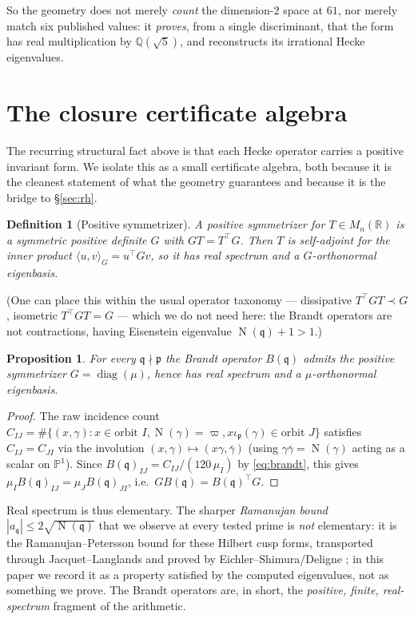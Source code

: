 \documentclass[11pt,a4paper]{article}
\newtheorem{proposition}[theorem]{Proposition}
\newtheorem{definition}[theorem]{Definition}
\newcommand{\Q}{\mathbb{Q}}
\newcommand{\R}{\mathbb{R}}
\newcommand{\PP}{\mathbb{P}}
\newcommand{\fp}{\mathfrak{p}}
\newcommand{\fq}{\mathfrak{q}}
\newcommand{\Brandt}{B}
\DeclareMathOperator{\Nm}{N}
\begin{document}
So the geometry does not merely \emph{count} the dimension-$2$ space at
$61$, nor merely match six published values: it \emph{proves}, from a
single discriminant, that the form has real multiplication by
$\Q(\sqrt5)$, and reconstructs its irrational Hecke eigenvalues.

\section{The closure certificate algebra}\label{sec:cert}

The recurring structural fact above is that each Hecke operator carries
a positive invariant form. We isolate this as a small certificate
algebra, both because it is the cleanest statement of what the geometry
guarantees and because it is the bridge to \S\ref{sec:rh}.

\begin{definition}[Positive symmetrizer]
A \emph{positive symmetrizer} for $T\in M_n(\R)$ is a symmetric positive
definite $G$ with $GT=T^\top G$. Then $T$ is self-adjoint for the inner
product $\langle u,v\rangle_G=u^\top G v$, so it has real spectrum and a
$G$-orthonormal eigenbasis.
\end{definition}

\noindent
(One can place this within the usual operator taxonomy --- dissipative
$T^\top GT\prec G$, isometric $T^\top GT=G$ --- which we do not need
here: the Brandt operators are not contractions, having Eisenstein
eigenvalue $\Nm(\fq)+1>1$.)

\begin{proposition}\label{prop:selfadj}
For every $\fq\nmid\fp$ the Brandt operator $\Brandt(\fq)$ admits the
positive symmetrizer $G=\operatorname{diag}(\mu)$, hence has real
spectrum and a $\mu$-orthonormal eigenbasis.
\end{proposition}
\begin{proof}
The raw incidence count $C_{IJ}=\#\{(x,\gamma):x\in\text{orbit }I,
\Nm(\gamma)=\varpi, x\iota_\fp(\gamma)\in\text{orbit }J\}$ satisfies
$C_{IJ}=C_{JI}$ via the involution $(x,\gamma)\mapsto(x\gamma,
\bar\gamma)$ (using $\gamma\bar\gamma=\Nm(\gamma)$ acting as a scalar
on $\PP^1$). Since $\Brandt(\fq)_{IJ}=C_{IJ}/(120\,\mu_I)$ by
\eqref{eq:brandt}, this gives $\mu_I\Brandt(\fq)_{IJ}=
\mu_J\Brandt(\fq)_{JI}$, i.e.\ $G\Brandt(\fq)=\Brandt(\fq)^\top G$.
\end{proof}

\noindent
Real spectrum is thus elementary. The sharper \emph{Ramanujan bound}
$|a_\fq|\le2\sqrt{\Nm(\fq)}$ that we observe at every tested prime is
\emph{not} elementary: it is the Ramanujan--Petersson bound for these
Hilbert cusp forms, transported through Jacquet--Langlands and proved by
Eichler--Shimura/Deligne \cite{JacquetLanglands1970,Eichler1973}; in
this paper we record it as a property satisfied by the computed
eigenvalues, not as something we prove. The Brandt operators are, in
short, the \emph{positive, finite, real-spectrum} fragment of the
arithmetic.
\end{document}
